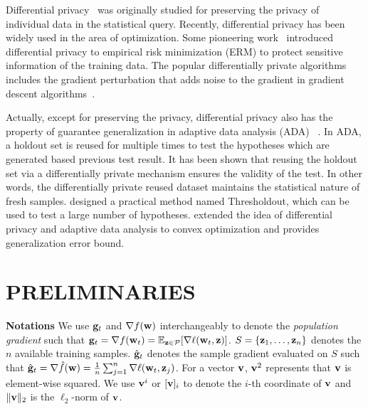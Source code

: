 \documentclass[11pt]{article}
\begin{document}
 Differential privacy~\cite{dwro2014} was originally studied for preserving the privacy of individual data in the statistical query. Recently, differential privacy has been widely used in the area of optimization. Some pioneering work~\citep{chmo2011, basm2014, waye2017} introduced differential privacy to empirical risk minimization (ERM) to protect sensitive information of the training data. The popular differentially private
algorithms includes the gradient perturbation that adds noise to the gradient in gradient descent algorithms~\citep{chmo2011,basm2014,waxu2019}.

Actually, except for preserving the privacy, differential privacy also has the property of guarantee generalization in adaptive data analysis (ADA) ~\cite{dwfe2015a,dwfe2015b,dwfe2015c}. In ADA, a holdout set is reused for multiple times to test the hypotheses which are generated based previous test result.  It has been shown that reusing the holdout set via a differentially private mechanism ensures the validity of the test. In other words, the differentially private reused dataset maintains the statistical nature of fresh samples. 
\citet{dwfe2015a, dwfe2015b, dwfe2015c} designed a practical method named Thresholdout, which can be used to test a large number of hypotheses. 
\citet{zhch2018} extended the idea of differential privacy and adaptive data analysis to convex optimization and provides generalization error bound.



\section{PRELIMINARIES}
\label{preliminary}

{\bf Notations} 
We use $\mathbf{g}_t$ and $\nabla f(\mathbf{w})$ interchangeably to denote the \emph{population gradient} such that $\g_t = \nabla f(\w_t) = \mathbb{E}_{\z \in \cP} [\nabla \ell(\w_t, \z)]$. $S = \left\{\mathbf{z}_{1}, \dots, \mathbf{z}_{n}\right\}$
denotes the $n$ available training samples. $\hat {\mathbf{g}}_t$ denotes the sample gradient evaluated on $S$ such that $\hat {\mathbf{g}}_t = \nabla \hat f(\mathbf{w}) = \frac{1}{n}\sum_{j=1}^n \nabla \ell(\mathbf{w}_t, \mathbf{z}_j)$. For a vector $\mathbf{v}$, $\mathbf{v}^2$ represents that $\mathbf{v}$ is element-wise squared.  We use $\mathbf{v}^i$ or $[\mathbf{v}]_i$ to denote the $i$-th coordinate of $\mathbf{v}$ and $\|\mathbf{v}\|_2$ is the $\ell_2$-norm of $\mathbf{v}$.
\end{document}
